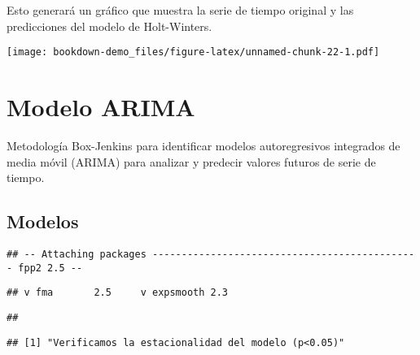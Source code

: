 \documentclass[
]{book}
\newenvironment{Shaded}{\begin{snugshade}}{\end{snugshade}}
\newcommand{\AttributeTok}[1]{\textcolor[rgb]{0.77,0.63,0.00}{#1}}
\newcommand{\DecValTok}[1]{\textcolor[rgb]{0.00,0.00,0.81}{#1}}
\newcommand{\FunctionTok}[1]{\textcolor[rgb]{0.00,0.00,0.00}{#1}}
\newcommand{\NormalTok}[1]{#1}
\newcommand{\SpecialCharTok}[1]{\textcolor[rgb]{0.00,0.00,0.00}{#1}}
\newcommand{\StringTok}[1]{\textcolor[rgb]{0.31,0.60,0.02}{#1}}
\begin{document}
Esto generará un gráfico que muestra la serie de tiempo original y las predicciones del modelo de Holt-Winters.

\begin{Shaded}
\end{Shaded}

\texttt{[image: bookdown-demo\_files/figure-latex/unnamed-chunk-22-1.pdf]}

\hypertarget{modelo-arima}{%
\chapter{Modelo ARIMA}\label{modelo-arima}}

Metodología Box-Jenkins para identificar modelos autoregresivos integrados de media móvil (ARIMA) para analizar y predecir valores futuros de serie de tiempo.

\hypertarget{modelos}{%
\section{Modelos}\label{modelos}}

\begin{verbatim}
## -- Attaching packages ---------------------------------------------- fpp2 2.5 --
\end{verbatim}

\begin{verbatim}
## v fma       2.5     v expsmooth 2.3
\end{verbatim}

\begin{verbatim}
## 
\end{verbatim}

\begin{verbatim}
## [1] "Verificamos la estacionalidad del modelo (p<0.05)"
\end{verbatim}
\end{document}
